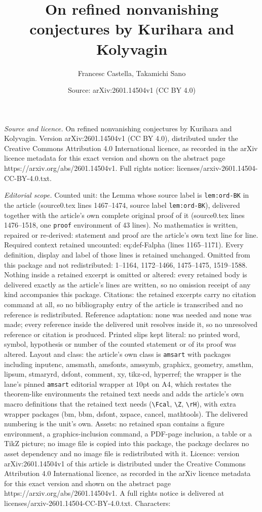\documentclass[10pt,a4paper]{amsart}
\title[On refined nonvanishing conjectures by Kurihara and Kolyvagi]{On refined nonvanishing conjectures by Kurihara and Kolyvagin}
\author{Francesc Castella, Takamichi Sano}
\date{Source: arXiv:2601.14504v1 (CC BY 4.0)}
\begin{document}
\maketitle

\noindent\emph{Source and licence.} On refined nonvanishing conjectures by Kurihara and Kolyvagin. Version arXiv:2601.14504v1 (CC BY 4.0), distributed under the Creative Commons Attribution 4.0 International licence, as recorded in the arXiv licence metadata for this exact version and shown on the abstract page https://arxiv.org/abs/2601.14504v1. Full rights notice: licenses/arxiv-2601.14504-CC-BY-4.0.txt.\par\smallskip

\noindent\textit{Editorial scope.} Counted unit: the Lemma whose source label is \texttt{lem:ord-BK} in the article (source0.tex lines 1467--1474, source label \texttt{lem:ord-BK}), delivered together with the article's own complete original proof of it (source0.tex lines 1476--1518, one \texttt{proof} environment of 43 lines). No mathematics is written, repaired or re-derived: statement and proof are the article's own text line for line. Required context retained uncounted: eq:def-Falpha (lines 1165--1171). Every definition, display and label of those lines is retained unchanged. Omitted from this package and not redistributed: 1--1164, 1172--1466, 1475--1475, 1519--1588. Nothing inside a retained excerpt is omitted or altered: every retained body is delivered exactly as the article's lines are written, so no omission receipt of any kind accompanies this package. Citations: the retained excerpts carry no citation command at all, so no bibliography entry of the article is transcribed and no reference is redistributed. Reference adaptation: none was needed and none was made; every reference inside the delivered unit resolves inside it, so no unresolved reference or citation is produced. Printed slips kept literal: no printed word, symbol, hypothesis or number of the counted statement or of its proof was altered. Layout and class: the article's own class is \texttt{amsart} with packages including inputenc, amsmath, amsfonts, amssymb, graphicx, geometry, amsthm, lipsum, stmaryrd, dsfont, comment, xy, tikz-cd, hyperref; the wrapper is the lane's pinned \texttt{amsart} editorial wrapper at 10pt on A4, which restates the theorem-like environments the retained text needs and adds the article's own macro definitions that the retained text needs (\texttt{\textbackslash Fcal}, \texttt{\textbackslash Z}, \texttt{\textbackslash rH}), with extra wrapper packages (bm, bbm, dsfont, xspace, cancel, mathtools). The delivered numbering is the unit's own. Assets: no retained span contains a figure environment, a graphics-inclusion command, a PDF-page inclusion, a table or a TikZ picture; no image file is copied into this package, the package declares no asset dependency and no image file is redistributed with it. Licence: version arXiv:2601.14504v1 of this article is distributed under the Creative Commons Attribution 4.0 International licence, as recorded in the arXiv licence metadata for this exact version and shown on the abstract page https://arxiv.org/abs/2601.14504v1. A full rights notice is delivered at licenses/arxiv-2601.14504-CC-BY-4.0.txt. Characters: 
\end{document}
